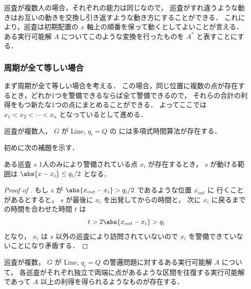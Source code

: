 巡査が複数人の場合，それぞれの能力は同じなので，
巡査がすれ違うような動きはお互いの動きを交換し引き返すような動き方にすることができる．
これにより，巡査は初期配置の $x$ 軸上の順番を保って動くとしてよいことが言える．
ある実行可能解 $A$ についてこのような変換を行ったものを $A^*$ と表すことにする．


\subsubsection{周期が全て等しい場合}
まず周期が全て等しい場合を考える．
この場合，同じ位置に複数の点が存在するとき，どれか1つを警備できるならば全て警備できるので，
それらの合計の利得をもつ新たな1つの点にまとめることができる．
よってここでは $x_1 < x_2 < \cdots < x_n$ となっているとして進める．


\begin{theo}
	\label{theo:MultiplePatrolOnLine_1}
	巡査が複数人， $G$ が Line, $q_i = Q$ の \maxprofit には多項式時間算法が存在する．
\end{theo}

初めに次の補題を示す．

\begin{lemm}
	\label{lemm:MultiplePatrolOnLine_3}
	ある巡査 $s$ 1人のみにより警備されている点 $x_i$ が存在するとき，
	$s$ が動ける範囲は $\abs{ x - x_i } \leq q_i / 2$ となる．
\end{lemm}

\begin{proof}[Proof of ]
	もし $s$ が $\abs{ x_{out} - x_i } > q_i /2$ であるような位置 $x_{out}$ に
	行くことがあるとすると，
	$s$ が最後に $x_i$ を出発してからの時間と，
	次に $x_i$ に戻るまでの時間を合わせた時間 $t$ は
	\begin{equation}
		t > 2 \abs{ x_{out} - x_i} > q_i
	\end{equation}
	となり，
	$x_i$ は $s$ 以外の巡査により訪問されていないので
	$x_i$ を警備できていないことになり矛盾する．
\end{proof}



\begin{lemm}
	\label{lemm:MultiplePatrolOnLine_2}
	巡査が複数， $G$ が Line, $q_i = Q$ の警邏問題に対するある実行可能解 $A$ について，
	各巡査がそれぞれ独立で両端に点があるような区間を往復する実行可能解であって
	$A$ 以上の利得を得られるようなものが存在する．
\end{lemm}

